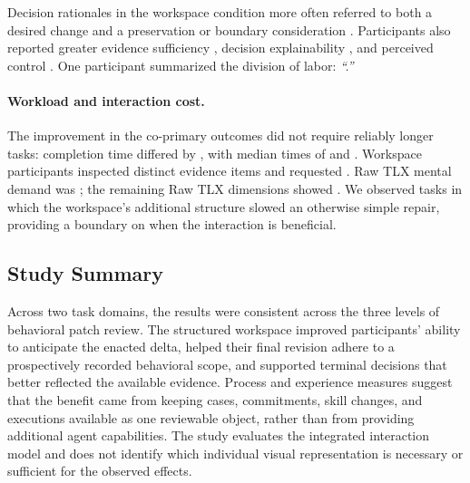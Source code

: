 Decision rationales in the workspace condition more often referred to both a
desired change and a preservation or boundary consideration
. Participants
also reported greater evidence sufficiency ,
decision explainability , and perceived control
. One participant summarized the division of labor:
\emph{``.''}

\paragraph{Workload and interaction cost.}
The improvement in the co-primary outcomes did not require reliably longer
tasks: completion time differed by , with median
times of  and . Workspace
participants inspected  distinct evidence
items and requested . Raw TLX
mental demand was ; the remaining Raw TLX
dimensions showed . We observed  tasks
in which the workspace's additional structure slowed an otherwise simple
repair, providing a boundary on when the interaction is beneficial.

\subsection{Study Summary}

Across two task domains, the results were consistent across the three
levels of behavioral patch review. The structured workspace improved
participants' ability to anticipate the enacted delta, helped their final
revision adhere to a prospectively recorded behavioral scope, and supported
terminal decisions that better reflected the available evidence. Process and
experience measures suggest that the benefit came from keeping cases,
commitments, skill changes, and executions available as one reviewable object,
rather than from providing additional agent capabilities. The study evaluates
the integrated interaction model and does not identify which individual visual
representation is necessary or sufficient for the observed effects.
